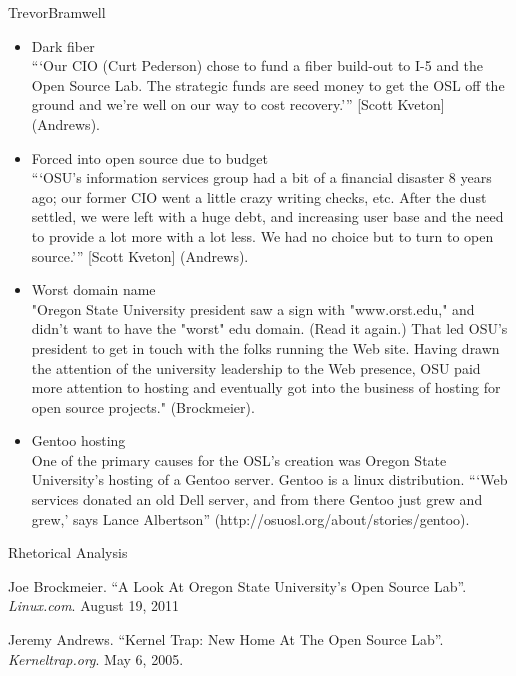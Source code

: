 \documentclass[12pt,letterpaper]{article}
\begin{document}
\begin{mla}{Trevor}{Bramwell}
\begin{itemize}
    \item Dark fiber \\
        ```Our CIO (Curt Pederson) chose to fund a fiber build-out to I-5 and the Open
        Source Lab. The strategic funds are seed money to get the OSL off the ground
        and we're well on our way to cost recovery.''' [Scott Kveton] (Andrews).

    \item Forced into open source due to budget \\
        ```OSU's information services group had a bit of a financial disaster 8 years
        ago; our former CIO went a little crazy writing checks, etc. After the dust
        settled, we were left with a huge debt, and increasing user base and the need
        to provide a lot more with a lot less. We had no choice but to turn to open
        source.''' [Scott Kveton] (Andrews).

    \item Worst domain name \\
        "Oregon State University president saw a sign with "www.orst.edu," and didn't
        want to have the "worst" edu domain. (Read it again.) That led OSU's president
        to get in touch with the folks running the Web site. Having drawn the attention
        of the university leadership to the Web presence, OSU paid more attention to
        hosting and eventually got into the business of hosting for open source
        projects." (Brockmeier).

    \item Gentoo hosting \\
        \tab One of the primary causes for the OSL's creation was Oregon State University's
        hosting of a Gentoo server. Gentoo is a linux distribution. ```Web services
        donated an old Dell server, and from there Gentoo just grew and grew,' says
        Lance Albertson'' (http://osuosl.org/about/stories/gentoo).
\end{itemize}

\pagebreak
{\centering Rhetorical Analysis\\}

\begin{workscited}
\bibent
Joe Brockmeier. ``A Look At Oregon State University's Open Source Lab''.
    \emph{Linux.com}. August 19, 2011

\bibent
Jeremy Andrews. ``Kernel Trap: New Home At The Open Source Lab''.
    \emph{Kerneltrap.org}. May 6, 2005.
\end{workscited}
\end{mla}
\end{document}
